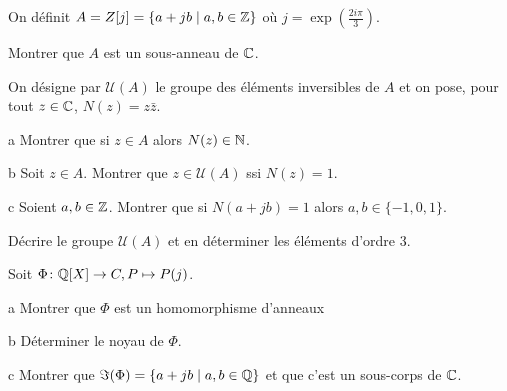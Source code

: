 \documentclass{report}
\begin{document}
\begin{exo}
    On définit \(A=Z[j]=\{a+jb\mid a,b\in\mathbb{Z}\}\) où \(j=\exp\left(\frac{2i\pi}{3}\right)\).
    \begin{q}{1}
        Montrer que \(A\) est un sous-anneau de \(\mathbb{C}\).
    \end{q}
    On désigne par \(\mathcal{U}(A)\) le groupe des éléments inversibles de \(A\)
    et on pose, pour tout \(z\in\mathbb{C}\), \(N(z)=z\bar{z}\).
    \begin{q}{2}
        \begin{q}{a}
            Montrer que si \(z\in A\) alors \(N(z)\in\mathbb{N}\).
        \end{q}
        \begin{q}{b}
            Soit \(z\in A\). Montrer que \(z\in\mathcal{U}(A)\) ssi \(N(z)=1\).
        \end{q}
        \begin{q}{c}
            Soient \(a,b\in\mathbb{Z}\). Montrer que si \(N(a+jb)=1\) alors
            \(a,b\in\{-1,0,1\}\).
        \end{q}
    \end{q}
    \begin{q}{3}
        Décrire le groupe \(\mathcal{U}(A)\) et en déterminer les éléments d'ordre 3.
    \end{q}
    \begin{q}{4}
        Soit \(\Phi\colon\mathbb{Q}[X]\to C,P\mapsto P(j)\).
        \begin{q}{a}
            Montrer que \(\Phi\) est un homomorphisme d'anneaux
        \end{q}
        \begin{q}{b}
            Déterminer le noyau de \(\Phi\).
        \end{q}
        \begin{q}{c}
            Montrer que \(\Im(\Phi)=\{a+jb\mid a,b\in\mathbb{Q}\}\) et que c'est un sous-corps
            de \(\mathbb{C}\).
        \end{q}
    \end{q}
\end{exo}
\end{document}
